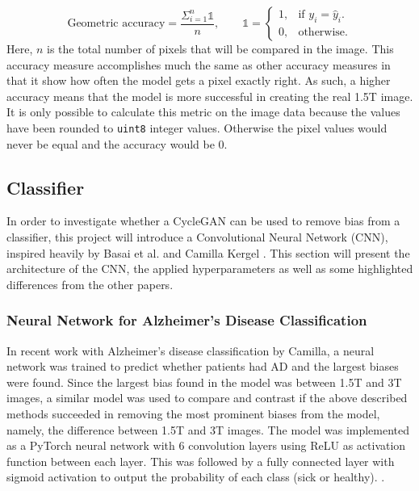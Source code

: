 \documentclass[11pt, fleqn, titlepage]{article}
\newcommand{\1}[1]{\mathds{1}\left[#1\right]}
\begin{document}
\begin{equation}
	\textrm{Geometric accuracy} = \frac{\Sigma_{i=1}^{n}\mathds{1}}{n}, \qquad
	  \mathds{1}=\begin{cases} 1, & \text{if $y_i = \hat{y}_i$}.\\ 0, & \text{otherwise}.\end{cases}
\end{equation}
Here, $n$ is the total number of pixels that will be compared in the image. This accuracy measure accomplishes much the same as other accuracy measures in that it show how often the model gets a pixel exactly right. As such, a higher accuracy means that the model is more successful in creating the real 1.5T image. It is only possible to calculate this metric on the image data because the values have been rounded to \texttt{uint8} integer values. Otherwise the pixel values would never be equal and the accuracy would be 0.


\subsection{Classifier}

In order to investigate whether a CycleGAN can be used to remove bias from a classifier, this project will introduce a Convolutional Neural Network (CNN), inspired heavily by Basai et al. and Camilla Kergel \cite{CamillaKandidat} \cite{neuro}. This section will present the architecture of the CNN, the applied hyperparameters as well as some highlighted differences from the other papers.

\subsubsection{Neural Network for Alzheimer's Disease Classification} \label{camillas_model}
In recent work with Alzheimer's disease classification by Camilla, a neural network was trained to predict whether patients had AD and the largest biases were found. Since the largest bias found in the model was between 1.5T and 3T images, a similar model was used to compare and contrast if the above described methods succeeded in removing the most prominent biases from the model, namely, the difference between 1.5T and 3T images. The model was implemented as a PyTorch neural network with 6 convolution layers using ReLU as activation function between each layer. This was followed by a fully connected layer with sigmoid activation to output the probability of each class (sick or healthy).  \cite{CamillaKandidat}.
\end{document}
